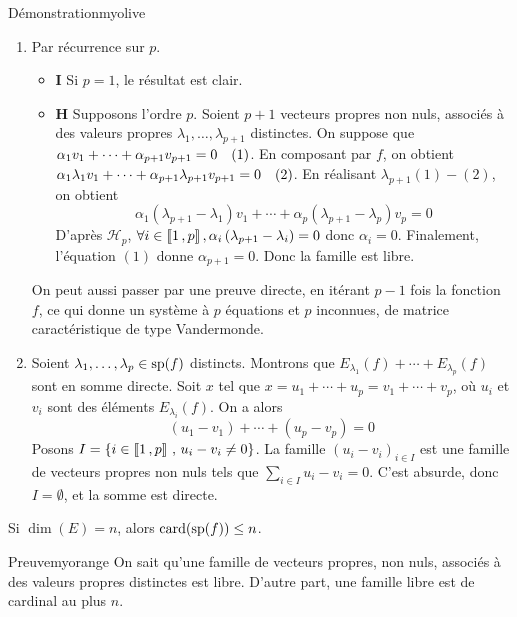     \begin{demo}{Démonstration}{myolive}
        \begin{enumerate}
            \item Par récurrence sur $p$.
            \begin{itemize}
                \item \textbf{I} \quad Si $p = 1$, le résultat est clair.
                \item \textbf{H} \quad Supposons l’ordre $p$. Soient $p+1$ vecteurs propres non nuls, associés à des valeurs propres $\lambda_1,\ldots, \lambda_{p+1}$ distinctes. On suppose que $\alpha_1 v_1 + \cdots + \alpha_{p+1} v_{p+1} = 0 \eqlabel{1}$. En composant par $f$, on obtient $\alpha_1 \lambda_1 v_1 + \cdots + \alpha_{p+1} \lambda_{p+1} v_{p+1} = 0 \eqlabel{2}$. En réalisant $\lambda_{p+1} (1) - (2)$, on obtient 
                \[ \alpha_1 (\lambda_{p+1} - \lambda_1) v_1 + \cdots + \alpha_p (\lambda_{p+1} - \lambda_p) v_p = 0 \]    
                D’après $\mathcal{H}_p$, $\forall i \in \intervalleEntier{1}{p}, \alpha_i \left(\lambda_{p+1} - \lambda_i\right) = 0$ donc $\alpha_i = 0$. Finalement, l’équation $(1)$ donne $\alpha_{p+1} = 0$. Donc la famille est libre.
            \end{itemize}
            On peut aussi passer par une preuve directe, en itérant $p-1$ fois la fonction $f$, ce qui donne un système à $p$ équations et $p$ inconnues, de matrice caractéristique de type Vandermonde.
            \item Soient $\lambda_1, \ldots, \lambda_p \in \sp(f)$ distincts. Montrons que $E_{\lambda_1}(f) + \cdots + E_{\lambda_p}(f)$ sont en somme directe. Soit $x$ tel que $x = u_1 + \cdots + u_p = v_1 + \cdots + v_p$, où $u_i$ et $v_i$ sont des éléments $E_{\lambda_i}(f)$. On a alors 
            \[ (u_1 - v_1) + \cdots + (u_p - v_p) = 0 \]   
            Posons $I = \enstq{i \in \intervalleEntier{1}{p}}{u_i - v_i \neq 0}$. La famille $(u_i - v_i)_{i \in I}$ est une famille de vecteurs propres non nuls tels que $\sum_{i \in I} u_i - v_i = 0$. C’est absurde, donc $I = \emptyset$, et la somme est directe.
        \end{enumerate}
    \end{demo}

    \begin{coro}{}{}
        Si $\dim(E) = n$, alors $\card(\sp(f)) \leq n$.
    \end{coro}

    \begin{demo}{Preuve}{myorange}
        On sait qu’une famille de vecteurs propres, non nuls, associés à des valeurs propres distinctes est libre. D’autre part, une famille libre est de cardinal au plus $n$.
    \end{demo}

